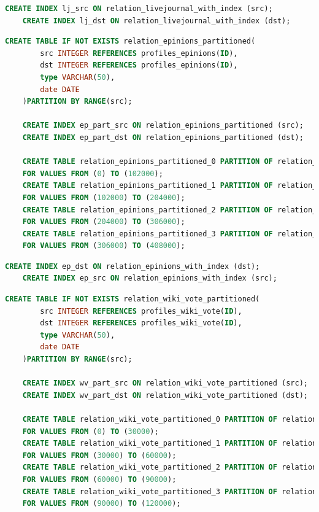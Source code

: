 \begin{lstlisting}[language=SQL,caption=Erstellen von Indexen auf relation Tabelle livejournal,frame=single, label={indexlivejournal}]
    CREATE INDEX lj_src ON relation_livejournal_with_index (src);
    CREATE INDEX lj_dst ON relation_livejournal_with_index (dst);
\end{lstlisting}

\begin{lstlisting}[language=SQL,caption=Erstellen von partitionierten Tabellen mit Index epinion,frame=single, label={parttableindexepinion}]
    CREATE TABLE IF NOT EXISTS relation_epinions_partitioned(
        src INTEGER REFERENCES profiles_epinions(ID),
        dst INTEGER REFERENCES profiles_epinions(ID),
        type VARCHAR(50),
        date DATE
    )PARTITION BY RANGE(src);

    CREATE INDEX ep_part_src ON relation_epinions_partitioned (src);
    CREATE INDEX ep_part_dst ON relation_epinions_partitioned (dst);

    CREATE TABLE relation_epinions_partitioned_0 PARTITION OF relation_epinions_partitioned
    FOR VALUES FROM (0) TO (102000);
    CREATE TABLE relation_epinions_partitioned_1 PARTITION OF relation_epinions_partitioned
    FOR VALUES FROM (102000) TO (204000);
    CREATE TABLE relation_epinions_partitioned_2 PARTITION OF relation_epinions_partitioned
    FOR VALUES FROM (204000) TO (306000);
    CREATE TABLE relation_epinions_partitioned_3 PARTITION OF relation_epinions_partitioned
    FOR VALUES FROM (306000) TO (408000);
\end{lstlisting}

\begin{lstlisting}[language=SQL,caption=Erstellen von Indexen auf relation Tabelle epinion,frame=single, label={indexepinion}]
    CREATE INDEX ep_dst ON relation_epinions_with_index (dst);
    CREATE INDEX ep_src ON relation_epinions_with_index (src);
\end{lstlisting}

\begin{lstlisting}[language=SQL,caption=Erstellen von partitionierten Tabellen mit wikivote epinion,frame=single, label={parttableindexwikivote}]
    CREATE TABLE IF NOT EXISTS relation_wiki_vote_partitioned(
        src INTEGER REFERENCES profiles_wiki_vote(ID),
        dst INTEGER REFERENCES profiles_wiki_vote(ID),
        type VARCHAR(50),
        date DATE
    )PARTITION BY RANGE(src);

    CREATE INDEX wv_part_src ON relation_wiki_vote_partitioned (src);
    CREATE INDEX wv_part_dst ON relation_wiki_vote_partitioned (dst);

    CREATE TABLE relation_wiki_vote_partitioned_0 PARTITION OF relation_wiki_vote_partitioned
    FOR VALUES FROM (0) TO (30000);
    CREATE TABLE relation_wiki_vote_partitioned_1 PARTITION OF relation_wiki_vote_partitioned
    FOR VALUES FROM (30000) TO (60000);
    CREATE TABLE relation_wiki_vote_partitioned_2 PARTITION OF relation_wiki_vote_partitioned
    FOR VALUES FROM (60000) TO (90000);
    CREATE TABLE relation_wiki_vote_partitioned_3 PARTITION OF relation_wiki_vote_partitioned
    FOR VALUES FROM (90000) TO (120000);
\end{lstlisting}

